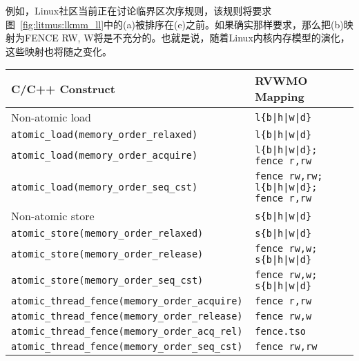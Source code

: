 例如，Linux社区当前正在讨论临界区次序规则，该规则将要求图~\ref{fig:litmus:lkmm_ll}中的(a)被排序在(e)之前。如果确实那样要求，那么把(b)映射为FENCE RW, W将是不充分的。也就是说，随着Linux内核内存模型的演化，这些映射也将随之变化。

\begin{table}[h!]
  \centering
  \begin{tabular}{|l|l|}
    \hline
    C/C++ Construct                            & RVWMO Mapping \\
    \hline
    \hline
    Non-atomic load                            & \tt l\{b|h|w|d\}               \\
    \hline
    \tt atomic\_load(memory\_order\_relaxed)   & \tt l\{b|h|w|d\}               \\
    \hline
    \tt atomic\_load(memory\_order\_acquire)   & \tt l\{b|h|w|d\}; fence r,rw    \\
    \hline
    \tt atomic\_load(memory\_order\_seq\_cst)  & \tt fence rw,rw; l\{b|h|w|d\}; fence r,rw       \\
    \hline
    \hline
    Non-atomic store                           & \tt s\{b|h|w|d\}               \\
    \hline
    \tt atomic\_store(memory\_order\_relaxed)  & \tt s\{b|h|w|d\}               \\
    \hline
    \tt atomic\_store(memory\_order\_release)  & \tt fence rw,w; s\{b|h|w|d\}  \\
    \hline
    \tt atomic\_store(memory\_order\_seq\_cst) & \tt fence rw,w; s\{b|h|w|d\}  \\
    \hline
    \hline
    \tt atomic\_thread\_fence(memory\_order\_acquire)  & \tt fence r,rw \\
    \hline
    \tt atomic\_thread\_fence(memory\_order\_release)  & \tt fence rw,w \\
    \hline
    \tt atomic\_thread\_fence(memory\_order\_acq\_rel) & {\tt fence.tso} \\
    \hline
    \tt atomic\_thread\_fence(memory\_order\_seq\_cst) & \tt fence rw,rw \\

\end{tabular}
\end{table}
